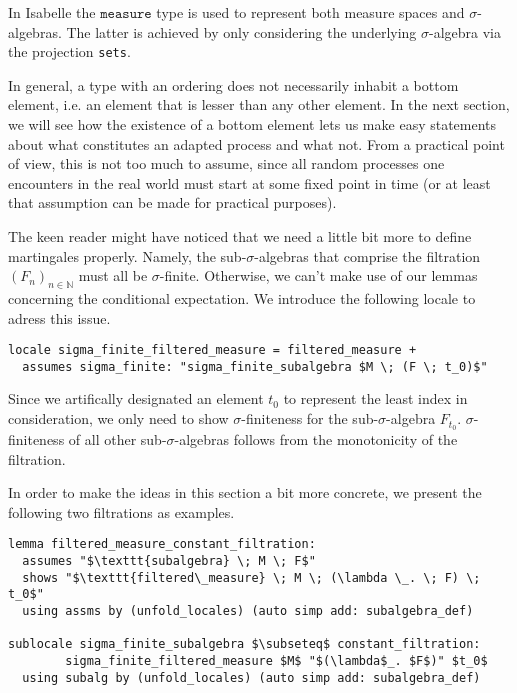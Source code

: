 \begin{remark}
	In Isabelle the $\texttt{measure}$ type is used to represent both measure spaces and $\sigma$-algebras. The latter is achieved by only considering the underlying $\sigma$-algebra via the projection \texttt{sets}.
\end{remark}

In general, a type with an ordering does not necessarily inhabit a bottom element, i.e. an element that is lesser than any other element. In the next section, we will see how the existence of a bottom element lets us make easy statements about what constitutes an adapted process and what not. From a practical point of view, this is not too much to assume, since all random processes one encounters in the real world must start at some fixed point in time (or at least that assumption can be made for practical purposes).

The keen reader might have noticed that we need a little bit more to define martingales properly. Namely, the sub-$\sigma$-algebras that comprise the filtration $(F_n)_{n \in \mathbb{N}}$ must all be $\sigma$-finite. Otherwise, we can't make use of our lemmas concerning the conditional expectation. We introduce the following locale to adress this issue.

\begin{isadefinition}
{\small
\begin{lstlisting}[style=isabelle]
locale sigma_finite_filtered_measure = filtered_measure +
  assumes sigma_finite: "sigma_finite_subalgebra $M \; (F \; t_0)$"
  \end{lstlisting}
}
\end{isadefinition}
\begin{remark}
	Since we artifically designated an element $t_0$ to represent the least index in consideration, we only need to show $\sigma$-finiteness for the sub-$\sigma$-algebra $F_{t_0}$. $\sigma$-finiteness of all other sub-$\sigma$-algebras follows from the monotonicity of the filtration.
\end{remark}

In order to make the ideas in this section a bit more concrete, we present the following two filtrations as examples.

\begin{isalemma}
{\small
\begin{lstlisting}[style=isabelle]
lemma filtered_measure_constant_filtration:
  assumes "$\texttt{subalgebra} \; M \; F$"
  shows "$\texttt{filtered\_measure} \; M \; (\lambda \_. \; F) \; t_0$"
  using assms by (unfold_locales) (auto simp add: subalgebra_def)

sublocale sigma_finite_subalgebra $\subseteq$ constant_filtration: 
		sigma_finite_filtered_measure $M$ "$(\lambda$_. $F$)" $t_0$
  using subalg by (unfold_locales) (auto simp add: subalgebra_def)
\end{lstlisting}
}
\end{isalemma}


